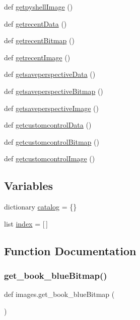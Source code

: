 \begin{DoxyCompactItemize}
def \hyperlink{namespaceimages_a9ea41392546f608f23ba3f4674061fa3}{getpyshell\+Image} ()
\item 
def \hyperlink{namespaceimages_a9d897eaa85415fba9658c4642f1f2152}{getrecent\+Data} ()
\item 
def \hyperlink{namespaceimages_ae7e23a7d49c169647126d3c9e2b3eb0f}{getrecent\+Bitmap} ()
\item 
def \hyperlink{namespaceimages_aee17f3301429c42b24577517bb7a12bd}{getrecent\+Image} ()
\item 
def \hyperlink{namespaceimages_a5c65b00e1312b2ea05eefb933a4b0b05}{getsaveperspective\+Data} ()
\item 
def \hyperlink{namespaceimages_a1837442bb3b6afc1d9c2bf47de0212d6}{getsaveperspective\+Bitmap} ()
\item 
def \hyperlink{namespaceimages_a59a28f3572347d6753c73514a00bb81e}{getsaveperspective\+Image} ()
\item 
def \hyperlink{namespaceimages_a24e2aa03f0ee46b3385dfd337dbc2d1c}{getcustomcontrol\+Data} ()
\item 
def \hyperlink{namespaceimages_ac979c6e876c096c46103c6bbcd0792f6}{getcustomcontrol\+Bitmap} ()
\item 
def \hyperlink{namespaceimages_a25901646c16edc9965eeb7352b5442ac}{getcustomcontrol\+Image} ()
\end{DoxyCompactItemize}
\subsection*{Variables}
\begin{DoxyCompactItemize}
\item 
dictionary \hyperlink{namespaceimages_a284ad62ca886e6f99cb88faae84382f7}{catalog} = \{\}
\item 
list \hyperlink{namespaceimages_a54407fd574970b3178647ae096321a57}{index} = \mbox{[}$\,$\mbox{]}
\end{DoxyCompactItemize}


\subsection{Function Documentation}
\mbox{\label{namespaceimages_a5e3e22e08960039b29ff55566be4691c}} 
\subsubsection{\texorpdfstring{get\+\_\+book\+\_\+blue\+Bitmap()}{get\_book\_blueBitmap()}}
{\footnotesize\ttfamily def images.\+get\+\_\+book\+\_\+blue\+Bitmap (\begin{DoxyParamCaption}{ }\end{DoxyParamCaption})}



